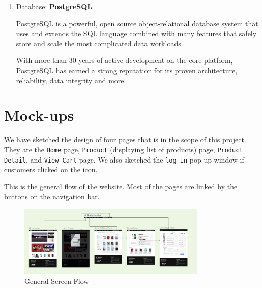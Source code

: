 \documentclass[a4paper]{article}
\numberwithin{equation}{section}
\begin{document}
\begin{enumerate}[label=\alph*.]
  \item Database: \textbf{PostgreSQL}

        PostgreSQL is a powerful, open source object-relational database system that uses and extends the SQL language combined with many features that safely store and scale the most complicated data workloads.

        With more than 30 years of active development on the core platform, PostgreSQL has earned a strong reputation for its proven architecture, reliability, data integrity and more.
\end{enumerate}

\section{Mock-ups}

We have sketched the design of four pages that is in the scope of this project.
They are the \texttt{Home} page, \texttt{Product} (displaying list of products) page, \texttt{Product Detail}, and \texttt{View Cart} page.
We also sketched the \texttt{log in} pop-up window if customers clicked on the icon.

This is the general flow of the website.
Most of the pages are linked by the buttons on the navigation bar.

\begin{figure}[H]
  \centering
  \includegraphics[width=0.8\textwidth]{assets/p2/screenflow.png}
  \caption{General Screen Flow}
\end{figure}
\end{document}
